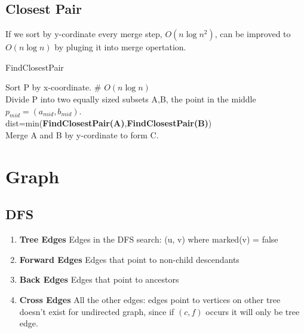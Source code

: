 \documentclass{article}
\begin{document}
\subsection{Closest Pair}
If we sort by y-cordinate every merge step, $O(n\log n^2)$, can be improved to $O(n\log n )$ by pluging it into merge opertation.
\begin{algorithm}
    \caption{FindClosestPair}
    Sort P by x-coordinate. \# $O(n\log n)$\\
    Divide P into two equally sized subsets A,B, the point in the middle $p_{mid}=(a_{mid},b_{mid})$.\\
    dist=min(\textbf{FindClosestPair(A)},\textbf{FindClosestPair(B)})\\
    Merge A and B by y-cordinate to form C.\\

\end{algorithm}
\section{Graph}
\subsection{DFS}
\begin{enumerate}
    \item \textbf{Tree Edges} Edges in the DFS search: (u, v) where marked(v) = false
    \item \textbf{Forward Edges} Edges that point to non-child descendants
    \item \textbf{Back Edges} Edges that point to ancestors
    \item \textbf{Cross Edges} All the other edges: edges point to vertices on other tree
    doesn't exist for undirected graph, since if $(c,f)$ occurs it will only be tree edge.
\end{enumerate}
\end{document}
